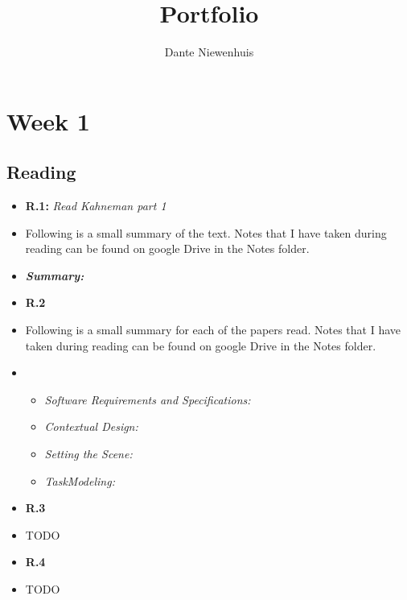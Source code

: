 \documentclass{article}
\title{Portfolio}
\author{Dante Niewenhuis}
\begin{document}
\maketitle

\section*{Week 1}

\subsection*{Reading}
\begin{itemize}
    \item[] \textbf{R.1: } \textit{Read Kahneman part 1}
    \item[] Following is a small summary of the text. 
    Notes that I have taken during reading can be found on google Drive in the Notes folder.
    \item[] \textbf{\textit{Summary:}}  
    \item[] \textbf{R.2}
    \item[] Following is a small summary for each of the papers read. 
    Notes that I have taken during reading can be found on google Drive in the Notes folder.
    \item[] 
    \begin{itemize}
        \item[] \textit{Software Requirements and Specifications: }
        \item[] \textit{Contextual Design: }
        \item[] \textit{Setting the Scene: }
        \item[] \textit{TaskModeling: }   
    \end{itemize} 
    \item[] \textbf{R.3}
    \item[] TODO
    \item[] \textbf{R.4}
    \item[] TODO
\end{itemize}
\end{document}
